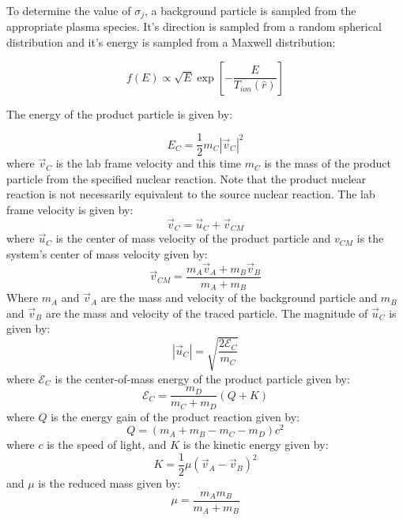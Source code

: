 	To determine the value of $\sigma_j$, a background particle is sampled from the appropriate plasma species. It's direction is sampled from a random spherical distribution and it's energy is sampled from a Maxwell distribution:
	
	\begin{equation}
		f(E) \propto \sqrt{E} \exp \left[ - \frac{E}{T_{ion}(\hat{r})}\right]
	\end{equation}
	
	The energy of the product particle is given by:
	
	\begin{equation}
		E_C = \frac{1}{2} m_C |\vec{v}_C|^2
	\end{equation}
	where $\vec{v}_C$ is the lab frame velocity and this time $m_C$ is the mass of the product particle from the specified nuclear reaction. Note that the product nuclear reaction is not necessarily equivalent to the source nuclear reaction. The lab frame velocity is given by:
	\begin{equation}
		\vec{v}_C = \vec{u}_C + \vec{v}_{CM}
	\end{equation}
	where $\vec{u}_C$ is the center of mass velocity of the product particle and $v_{CM}$ is the system's center of mass velocity given by:
	\begin{equation}
		\vec{v}_{CM} = \frac{m_A\vec{v}_A + m_B\vec{v}_B}{m_A + m_B}
	\end{equation}
	Where $m_A$ and $\vec{v}_A$ are the mass and velocity of the background particle and $m_B$ and $\vec{v}_B$ are the mass and velocity of the traced particle. The magnitude of $\vec{u}_C$ is given by:
	\begin{equation}
		|\vec{u}_C| = \sqrt{\frac{2\mathcal{E}_C}{m_C}}
	\end{equation}
	where $\mathcal{E}_C$ is the center-of-mass energy of the product particle given by:
	\begin{equation}
		\mathcal{E}_C = \frac{m_D}{m_C+m_D} \left(Q + K\right)
	\end{equation}
	where $Q$ is the energy gain of the product reaction given by:
	\begin{equation}
		Q = \left(m_A + m_B - m_C - m_D\right)c^2
	\end{equation}
	where $c$ is the speed of light, and $K$ is the kinetic energy given by:
	\begin{equation}
		K = \frac{1}{2}\mu \left(\vec{v}_A - \vec{v}_B\right)^2
	\end{equation}
	and $\mu$ is the reduced mass given by:
	\begin{equation}
		\mu = \frac{m_A m_B}{m_A + m_B}
	\end{equation}

